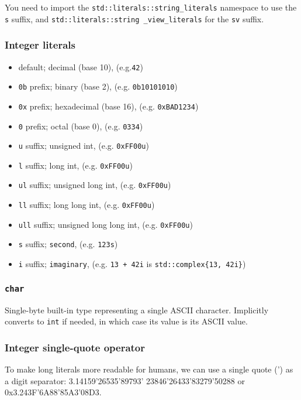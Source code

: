 \documentclass[8pt, table, xcdraw]{article}%
\begin{document}
You need to import the \lstinline{std::literals::string_literals} namespace to use the \lstinline{s} suffix, and \lstinline{std::literals::string _view_literals} for the \lstinline{sv} suffix.

\subsubsection{Integer literals}

\begin{itemize}[leftmargin=15pt,noitemsep,nolistsep]
\item default; decimal (base 10), (e.g.\lstinline{42})
\item \lstinline{0b} prefix; binary (base 2), (e.g. \lstinline{0b10101010})
\item \lstinline{0x} prefix; hexadecimal (base 16), (e.g. \lstinline{0xBAD1234})
\item \lstinline{0} prefix; octal (base 0), (e.g. \lstinline{0334})
\item \lstinline{u} suffix; unsigned int, (e.g. \lstinline{0xFF00u})
\item \lstinline{l} suffix; long int, (e.g. \lstinline{0xFF00u})
\item \lstinline{ul} suffix; unsigned long int, (e.g. \lstinline{0xFF00u})
\item \lstinline{ll} suffix; long long int, (e.g. \lstinline{0xFF00u})
\item \lstinline{ull} suffix; unsigned long long int, (e.g. \lstinline{0xFF00u})
\item \lstinline{s} suffix; \lstinline{second}, (e.g. \lstinline{123s})
\item \lstinline{i} suffix; \lstinline{imaginary}, (e.g. \lstinline{13 + 42i} is \lstinline|std::complex{13, 42i}|)
\end{itemize}

\subsubsection{\lstinline{char}}

Single-byte built-in type representing a single ASCII character. Implicitly converts to \lstinline{int} if needed, in which case its value is its ASCII value.

\subsubsection{Integer single-quote operator}
To  make long literals more readable for humans, we can use a single quote (') as a digit separator: 3.14159'26535'89793' 23846'26433'83279'50288 or 0x3.243F'6A88'85A3'08D3.
\end{document}
